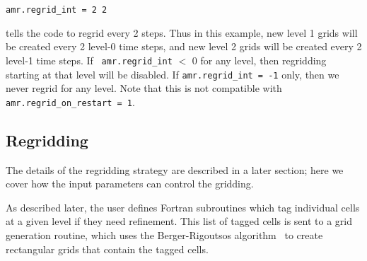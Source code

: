 \begin{lstlisting}
amr.regrid_int = 2 2
\end{lstlisting}
tells the code to regrid every 2 steps.  Thus in this example, new
level 1 grids will be created every 2 level-0 time steps, and new
level 2 grids will be created every 2 level-1 time steps. If {\tt
amr.regrid\_int} $<$ 0 for any level, then regridding starting at that
level will be disabled. If {\tt amr.regrid\_int = -1} only, then we
never regrid for any level. Note that this is not compatible with {\tt
amr.regrid\_on\_restart = 1}.


\subsection{Regridding}

The details of the regridding strategy are described in a later section; here we 
cover how the input parameters can control the gridding.

As described later, the user defines Fortran subroutines which tag individual
cells at a given level if they need refinement.  This list of tagged cells is
sent to a grid generation routine, which uses the Berger-Rigoutsos algorithm~\cite{br-refine}
to create rectangular grids that contain the tagged cells.   

